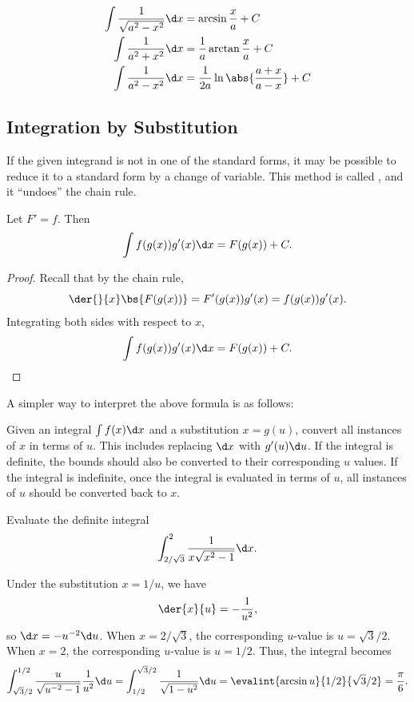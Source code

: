 \begin{proposition}
    \begin{align*}
        \int \frac1{\sqrt{a^2 - x^2}} \d x &= \arcsin \frac{x}{a} + C\\
        \int \frac1{a^2 + x^2} \d x &= \frac1{a} \arctan \frac{x}{a} + C\\
        \int \frac1{a^2 - x^2} \d x &= \frac1{2a} \ln \abs{\frac{a + x}{a-x}} + C
    \end{align*}
\end{proposition}

\subsection{Integration by Substitution}

If the given integrand is not in one of the standard forms, it may be possible to reduce it to a standard form by a change of variable. This method is called , and it ``undoes'' the chain rule.

\begin{proposition}
    Let $F' = f$. Then \[\int f(g(x)) g'(x) \d x = F(g(x)) + C.\]
\end{proposition}
\begin{proof}
    Recall that by the chain rule, \[\der{}{x} \bs{F(g(x))} = F'(g(x)) g'(x) = f(g(x)) g'(x).\] Integrating both sides with respect to $x$, \[\int f(g(x)) g'(x) \d x = F(g(x)) + C.\]
\end{proof}

A simpler way to interpret the above formula is as follows:

\begin{recipe}
    Given an integral $\int f(x) \d x$ and a substitution $x = g(u)$, convert all instances of $x$ in terms of $u$. This includes replacing $\d x$ with $g'(u) \d u$. If the integral is definite, the bounds should also be converted to their corresponding $u$ values. If the integral is indefinite, once the integral is evaluated in terms of $u$, all instances of $u$ should be converted back to $x$.
\end{recipe}

\begin{sample}
    Evaluate the definite integral \[\int_{2/\sqrt3}^2 \frac1{x\sqrt{x^2 - 1}} \d x.\]
\end{sample}
\begin{sampans}
    Under the substitution $x = 1/u$, we have \[\der{x}{u} = -\frac1{u^2},\] so $\d x = -u^{-2} \d u$. When $x = 2/\sqrt 3$, the corresponding $u$-value is $u = \sqrt3/2$. When $x = 2$, the corresponding $u$-value is $u = 1/2$. Thus, the integral becomes \[\int_{\sqrt3 / 2}^{1/2} \frac{u}{\sqrt{u^{-2} - 1}} \frac1{u^2} \d u = \int_{1/2}^{\sqrt3 /2} \frac1{\sqrt{1 - u^2}} \d u = \evalint{\arcsin u}{1/2}{\sqrt3 /2} = \frac\pi6.\]
\end{sampans}

